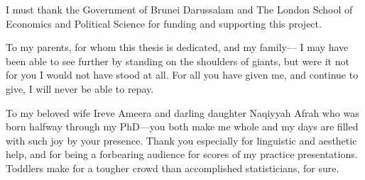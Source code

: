 \documentclass[11pt,twoside,openright,showframe]{report}
\begin{document}
I must thank the Government of Brunei Darussalam and The London School of Economics and Political Science for funding and supporting this project.

To my parents, for whom this thesis is dedicated, and my family---
I may have been able to see further by standing on the shoulders of giants, but were it not for you I would not have stood at all.
For all you have given me, and continue to give, I will never be able to repay.

To my beloved wife Ireve Ameera and darling daughter Naqiyyah Afrah who was born halfway through my PhD---you both make me whole and my days are filled with such joy by your presence.
Thank you especially for linguistic and aesthetic help, and for being a forbearing audience for scores of my practice presentations.
Toddlers make for a tougher crowd than accomplished statisticians, for sure.
\end{document}
